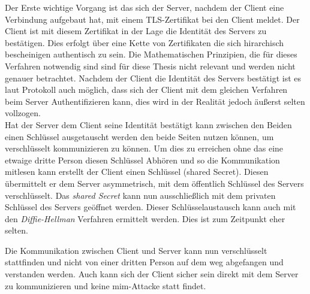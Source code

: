Der Erste wichtige Vorgang ist das sich der Server, nachdem der Client eine Verbindung aufgebaut hat, mit einem TLS-Zertifikat bei den Client meldet.
Der Client ist mit diesem Zertifikat in der Lage die Identität des Servers zu bestätigen.
Dies erfolgt über eine Kette von Zertifikaten die sich hirarchisch bescheinigen authentisch zu sein.
Die Mathematischen Prinzipien, die für dieses Verfahren notwendig sind sind für diese Thesis nicht relevant und werden nicht genauer betrachtet.
Nachdem der Client die Identität des Servers bestätigt ist es laut Protokoll auch möglich, dass sich der Client mit dem gleichen Verfahren beim Server Authentifizieren kann, dies wird in der Realität jedoch äußerst selten vollzogen.\\

Hat der Server dem Client seine Identität bestätigt kann zwischen den Beiden einen Schlüssel ausgetauscht werden den beide Seiten nutzen können, um verschlüsselt kommunizieren zu können.
Um dies zu erreichen ohne das eine etwaige dritte Person diesen Schlüssel Abhören und so die Kommunikation mitlesen kann erstellt der Client einen Schlüssel (shared Secret).
Diesen übermittelt er dem Server asymmetrisch, mit dem öffentlich Schlüssel des Servers verschlüsselt.
Das \textit{shared Secret} kann nun ausschließlich mit dem privaten Schlüssel des Servers geöffnet werden.
Dieser Schlüsselaustausch kann auch mit den \textit{Diffie-Hellman} Verfahren ermittelt werden.
Dies ist zum Zeitpunkt eher selten.

Die Kommunikation zwischen Client und Server kann nun verschlüsselt stattfinden und nicht von einer dritten Person auf dem weg abgefangen und verstanden werden.
Auch kann sich der Client sicher sein direkt mit dem Server zu kommunizieren und keine \ac{mim}-Attacke statt findet.

\pagebreak